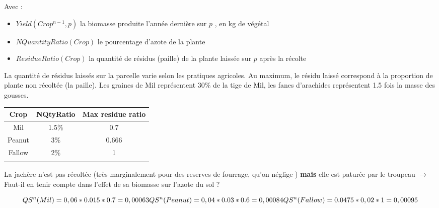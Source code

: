 \documentclass[10pt,a4paper,french]{article} %
\begin{document}
Avec  :

\begin{itemize}
	\item $Yield(Crop^{n-1},p)$  la biomasse produite l'année dernière sur $p$ , en kg de végétal
	\item $NQuantityRatio(Crop)$ le pourcentage d'azote de la plante 
	\item $ResidueRatio(Crop)$  la quantité de résidus (paille) de la plante laissée sur  $p$ après la récolte
\end{itemize}


La quantité de résidus laissés sur la parcelle varie selon les pratiques agricoles.
Au maximum, le résidu laissé correspond à la proportion de plante non récoltée (la paille).
Les graines de Mil représentent 30\% de la tige de Mil, les fanes d'arachides représentent 1.5 fois la masse des gousses.


\begin{table}[]
\begin{tabular}{|c|c|c|}
\hline
\textbf{Crop}          & \textbf{NQtyRatio}    & \textbf{Max residue ratio} \\ \hline
Mil                    & 1.5\%                 & 0.7                        \\ \hline
Peanut                 & 3\%                   & 0.666                      \\ \hline
Fallow                 & 2\%                   & 1                          \\ \hline
\multicolumn{1}{|l|}{} & \multicolumn{1}{r|}{} & \multicolumn{1}{r|}{}      \\ \hline
\end{tabular}
\end{table}



\begin{tcolorbox}[noparskip,
    colback=LightGreen,colframe=DarkGreen,%
    colbacklower=LimeGreen!75!LightGreen,%
    title=Question]

La jachère n'est pas récoltée (très marginalement pour des reserves de fourrage, qu'on néglige ) \textbf{mais} elle est paturée par le troupeau $\rightarrow$ Faut-il en tenir compte dans l'effet de sa biomasse sur l'azote du sol ? 

\end{tcolorbox}






\begin{equation}
QS^{n}(Mil)= 0,06 * 0.015 * 0.7 = 0,00063\\
QS^{n}(Peanut)= 0,04 * 0.03 * 0.6 = 0,00084\\
QS^{n}(Fallow)= 0.0475* 0,02 * 1 = 0,00095\\
\end{equation}
\end{document}
